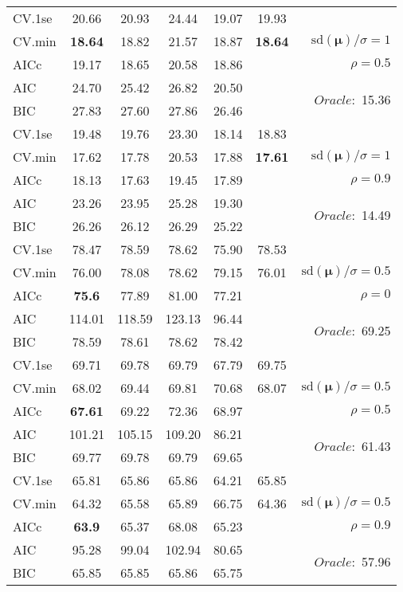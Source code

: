\begin{table}
\begin{center}
\begin{tabular}{l*{5}{c}|r}
 \hline 
CV.1se & 20.66 & 20.93 & 24.44 & 19.07 & 19.93 & \\
CV.min & {\bf 18.64} & 18.82 & 21.57 & 18.87 & {\bf 18.64} &  $\mathrm{sd}(\mathbf{\mu})/\sigma=1$ \\
AICc & 19.17 & 18.65 & 20.58 & 18.86 & & $\rho=0.5$ \\
AIC & 24.70 & 25.42 & 26.82 & 20.50 & &  \multirow{2}{*}{$Oracle: $ 15.36} \\
BIC & 27.83 & 27.60 & 27.86 & 26.46 & &  \\
 \hline 
CV.1se & 19.48 & 19.76 & 23.30 & 18.14 & 18.83 & \\
CV.min & 17.62 & 17.78 & 20.53 & 17.88 & {\bf 17.61} &  $\mathrm{sd}(\mathbf{\mu})/\sigma=1$ \\
AICc & 18.13 & 17.63 & 19.45 & 17.89 & & $\rho=0.9$ \\
AIC & 23.26 & 23.95 & 25.28 & 19.30 & &  \multirow{2}{*}{$Oracle: $ 14.49} \\
BIC & 26.26 & 26.12 & 26.29 & 25.22 & &  \\
 \hline 
CV.1se & 78.47 & 78.59 & 78.62 & 75.90 & 78.53 & \\
CV.min & 76.00 & 78.08 & 78.62 & 79.15 & 76.01 &  $\mathrm{sd}(\mathbf{\mu})/\sigma=0.5$ \\
AICc & {\bf 75.6} & 77.89 & 81.00 & 77.21 & & $\rho=0$ \\
AIC & 114.01 & 118.59 & 123.13 & 96.44 & &  \multirow{2}{*}{$Oracle: $ 69.25} \\
BIC & 78.59 & 78.61 & 78.62 & 78.42 & &  \\
 \hline 
CV.1se & 69.71 & 69.78 & 69.79 & 67.79 & 69.75 & \\
CV.min & 68.02 & 69.44 & 69.81 & 70.68 & 68.07 &  $\mathrm{sd}(\mathbf{\mu})/\sigma=0.5$ \\
AICc & {\bf 67.61} & 69.22 & 72.36 & 68.97 & & $\rho=0.5$ \\
AIC & 101.21 & 105.15 & 109.20 & 86.21 & &  \multirow{2}{*}{$Oracle: $ 61.43} \\
BIC & 69.77 & 69.78 & 69.79 & 69.65 & &  \\
 \hline 
CV.1se & 65.81 & 65.86 & 65.86 & 64.21 & 65.85 & \\
CV.min & 64.32 & 65.58 & 65.89 & 66.75 & 64.36 &  $\mathrm{sd}(\mathbf{\mu})/\sigma=0.5$ \\
AICc & {\bf 63.9} & 65.37 & 68.08 & 65.23 & & $\rho=0.9$ \\
AIC & 95.28 & 99.04 & 102.94 & 80.65 & &  \multirow{2}{*}{$Oracle: $ 57.96} \\
BIC & 65.85 & 65.85 & 65.86 & 65.75 & &  \\
 \hline 
\end{tabular}
\end{center}
\vspace{-1cm}
\end{table}




